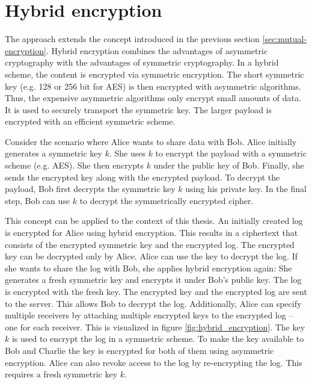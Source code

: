 \documentclass[../main.tex]{subfiles}
\begin{document}
\section{Hybrid encryption}
\label{sec:hybrid-encryption}

The approach extends the concept introduced in the previous section \ref{sec:mutual-encryption}.
Hybrid encryption combines the advantages of asymmetric cryptography with the advantages of symmetric cryptography.
In a hybrid scheme, the content is encrypted via symmetric encryption.
The short symmetric key (e.g. 128 or 256 bit for AES) is then encrypted with asymmetric algorithms.
Thus, the expensive asymmetric algorithms only encrypt small amounts of data.
It is used to securely transport the symmetric key.
The larger payload is encrypted with an efficient symmetric scheme.
~\cite[340]{Eckert2018}

Consider the scenario where Alice wants to share data with Bob.
Alice initially generates a symmetric key $k$.
She uses $k$ to encrypt the payload with a symmetric scheme (e.g. AES).
She then encrypts $k$ under the public key of Bob.
Finally, she sends the encrypted key along with the encrypted payload.
To decrypt the payload, Bob first decrypts the symmetric key $k$ using his private key.
In the final step, Bob can use $k$ to decrypt the symmetrically encrypted cipher.

This concept can be applied to the context of this thesis.
An initially created log is encrypted for Alice using hybrid encryption.
This results in a ciphertext that consists of the encrypted symmetric key and the encrypted log.
The encrypted key can be decrypted only by Alice.
Alice can use the key to decrypt the log.
If she wants to share the log with Bob, she applies hybrid encryption again:
She generates a fresh symmetric key and encrypts it under Bob's public key.
The log is encrypted with the fresh key.
The encrypted key and the encrypted log are sent to the server.
This allows Bob to decrypt the log.
Additionally, Alice can specify multiple receivers by attaching multiple encrypted keys to the encrypted log -- one for each receiver.
This is visualized in figure \ref{fig:hybrid_encryption}. 
The key $k$ is used to encrypt the log in a symmetric scheme.
To make the key available to Bob and Charlie the key is encrypted for both of them using asymmetric encryption.
Alice can also revoke access to the log by re-encrypting the log. 
This requires a fresh symmetric key $k$.
\end{document}
